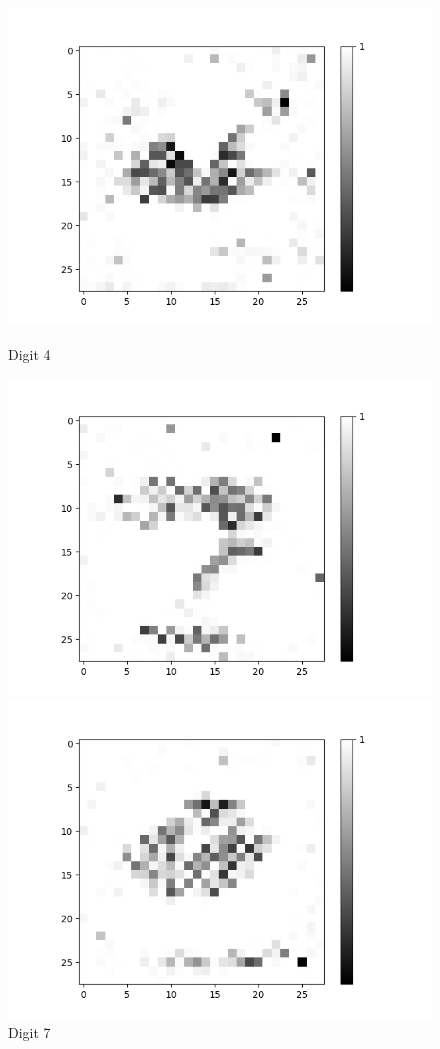 \begin{figure}[H]
\begin{minipage}[b]{0.19\textwidth}
		\includegraphics[width=\textwidth]{AND-OLD(LSM)/Layer0-Neuron-4.png}
		\caption{Digit 4}
	\end{minipage}
	\begin{minipage}[b]{0.19\textwidth}
		\includegraphics[width=\textwidth]{AND-OLD(LSM)/Layer0-Neuron-7.png}
		\caption{Digit 7}
	\end{minipage}
	\begin{minipage}[b]{0.19\textwidth}
		\includegraphics[width=\textwidth]{AND-OLD(LSM)/Layer0-Neuron-9.png}

\end{minipage}
\end{figure}
